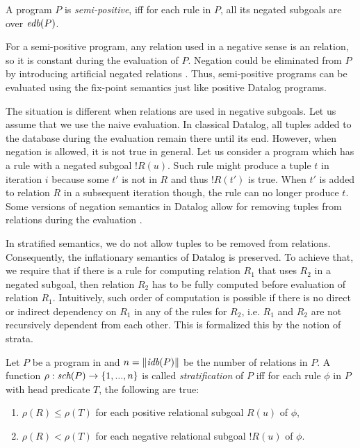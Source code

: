 \begin{defn}
A \datalogneg program $P$ is \emph{semi-positive}, iff for each rule in $P$, all its negated subgoals are over $\textit{edb}(P)$.
\end{defn}

For a semi-positive program, any relation used in a negative sense is an \edb relation, so it is constant during the evaluation of $P$. Negation could be eliminated from $P$ by introducing artificial negated \edb relations . Thus, semi-positive programs can be evaluated using the fix-point semantics just like positive Datalog programs.

The situation is different when \idb relations are used in negative subgoals. Let us assume that we use the naive evaluation. In classical Datalog, all tuples added to the database during the evaluation remain there until its end. However, when negation is allowed, it is not true in general. Let us consider a program which has a rule with a negated subgoal $!R(u)$. Such rule might produce a tuple $t$ in iteration $i$ because some $t'$ is not in $R$ and thus $!R(t')$ is true. When $t'$ is added to relation $R$ in a subsequent iteration though, the rule can no longer produce $t$. Some versions of negation semantics in Datalog allow for removing tuples from relations during the evaluation \cite{fod}.

In stratified semantics, we do not allow tuples to be removed from relations. Consequently, the inflationary semantics of Datalog is preserved. To achieve that, we require that if there is a rule for computing relation $R_1$ that uses $R_2$ in a negated subgoal, then relation $R_2$ has to be fully computed before evaluation of relation $R_1$. Intuitively, such order of computation is possible if there is no direct or indirect dependency on $R_1$ in any of the rules for $R_2$, i.e. $R_1$ and $R_2$ are not recursively dependent from each other. This is formalized this by the notion of strata.

\begin{defn}[Stratification]
Let $P$ be a program in \datalogneg and $n = \|\textit{idb}(P)\|$ be the number of \idb relations in $P$. A function $\rho : \textit{sch}(P) \to \{1, . . . , n\}$ is called \emph{stratification} of $P$ iff for each rule $\phi$ in $P$ with head predicate $T$, the following are true: 

\begin{enumerate}
\item $\rho(R) \le \rho(T)$ for each positive relational subgoal $R(u)$ of $\phi$,
\item $\rho(R) < \rho(T)$ for each negative relational subgoal $!R(u)$ of $\phi$.
\end{enumerate}
\end{defn}

